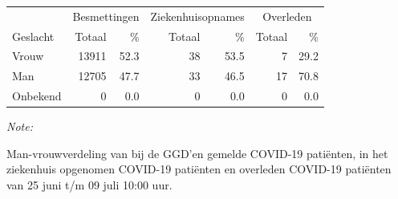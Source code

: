 \documentclass[
  english,
  man,floatsintext]{apa6}
\begin{document}
\begin{table}
\centering\begingroup\fontsize{11}{13}\selectfont

\begin{threeparttable}
\begin{tabular}{lrrrrrr}
\toprule
\multicolumn{1}{c}{ } & \multicolumn{2}{c}{Besmettingen} & \multicolumn{2}{c}{Ziekenhuisopnames} & \multicolumn{2}{c}{Overleden} \\
\cmidrule(l{3pt}r{3pt}){2-3} \cmidrule(l{3pt}r{3pt}){4-5} \cmidrule(l{3pt}r{3pt}){6-7}
Geslacht & Totaal & \% & Totaal & \% & Totaal & \%\\
\midrule
Vrouw & 13911 & 52.3 & 38 & 53.5 & 7 & 29.2\\
Man & 12705 & 47.7 & 33 & 46.5 & 17 & 70.8\\
Onbekend & 0 & 0.0 & 0 & 0.0 & 0 & 0.0\\
\bottomrule
\end{tabular}
\begin{tablenotes}
\item \textit{Note: } 
\item Man-vrouwverdeling van bij de GGD’en gemelde COVID-19 patiënten, in het ziekenhuis opgenomen COVID-19 patiënten en overleden COVID-19 patiënten van 25 juni t/m 09 juli 10:00 uur.
\end{tablenotes}
\end{threeparttable}
\endgroup{}
\end{table}
\newpage
\end{document}
